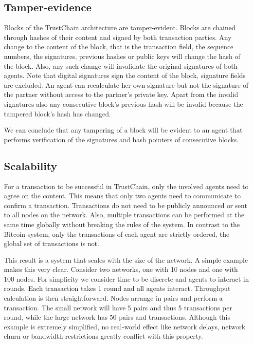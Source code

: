 \subsection{Tamper-evidence}
\label{sec:tamper-proof}
Blocks of the TrustChain architecture are tamper-evident. Blocks are chained through hashes of their
content and signed by both transaction parties. Any change to the content of the block, that is the
transaction field, the sequence numbers, the signatures, previous hashes or public keys will change
the hash of the block. Also, any such change will invalidate the original signatures of both agents.
Note that digital signatures sign the content of the block, signature fields are excluded. An agent
can recalculate her own signature but not the signature of the partner without access to the 
partner's private key. Apart from the invalid signatures also any consecutive block's previous hash
will be invalid because the tampered block's hash has changed.

We can conclude that any tampering of a block will be evident to an agent that performs verification
of the signatures and hash pointers of consecutive blocks.

\subsection{Scalability}
\label{sec:trustchain_scalability}
For a transaction to be successful in TrustChain, only the involved agents need to agree on the content. This
means that only two agents need to communicate to confirm a transaction. Transactions do not need to 
be publicly announced or sent to all nodes on
the network. Also, multiple transactions can be performed at the same time globally without breaking
the rules of the system. In contrast to the Bitcoin system, only the transactions of each agent are
strictly ordered, the global set of transactions is not.

This result is a system that scales with the size of the network. A simple example makes this very 
clear. Consider two networks, one with 10 nodes and one with 100 nodes. For simplicity we consider
time to be discrete and agents to interact in rounds. Each transaction takes 1 round and all agents 
interact. Throughput calculation is then straightforward. Nodes arrange in pairs and perform a
transaction. The small network will have 5 pairs and thus 5 transactions per round, while the large
network has 50 pairs and transactions. Although this example is extremely simplified, no real-world
effect like network delays, network churn or bandwidth restrictions greatly conflict with this property.

